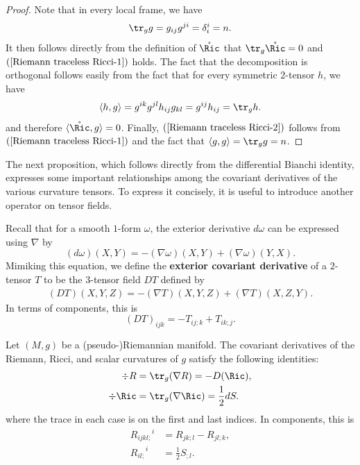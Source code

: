 \begin{proof}
Note that in every local frame, we have
\[\tr_gg=g_{ij}g^{ji}=\delta_i^i=n.\]
It then follows directly from the definition of $\mathring{\Ric}$ that $\tr_g\mathring{\Ric}=0$ and $(\ref{Riemann traceless Ricci-1})$ holds. The fact that the 
decomposition is orthogonal follows easily from the fact that for every symmetric $2$-tensor $h$, we have
\[\langle h,g\rangle=g^{ik}g^{jl}h_{ij}g_{kl}=g^{ij}h_{ij}=\tr_gh.\]
and therefore $\langle\mathring{\Ric},g\rangle=0$. Finally, $(\ref{Riemann traceless Ricci-2})$ follows from $(\ref{Riemann traceless Ricci-1})$ and the fact that 
$\langle g,g\rangle=\tr_gg=n$.
\end{proof}
The next proposition, which follows directly from the differential Bianchi identity, expresses some important relationships among the covariant derivatives of the 
various curvature tensors. To express it concisely, it is useful to introduce another operator on tensor fields.\par
Recall that for a smooth $1$-form $\omega$, the exterior derivative $d\omega$ can be expressed using $\nabla$ by
\[(d\omega)(X,Y)=-(\nabla\omega)(X,Y)+(\nabla\omega)(Y,X).\]
Mimiking this equation, we define the \textbf{exterior covariant derivative} of a $2$-tensor $T$ to be the $3$-tensor field $DT$ defined by
\begin{align}\label{Riemann ext derivative 2-tensor}
(DT)(X,Y,Z)=-(\nabla T)(X,Y,Z)+(\nabla T)(X,Z,Y).
\end{align}
In terms of components, this is
\[(DT)_{ijk}=-T_{ij;k}+T_{ik;j}.\]
\begin{proposition}
Let $(M,g)$ be a (pseudo-)Riemannian manifold. The covariant derivatives of the Riemann, Ricci, and scalar curvatures of $g$ satisfy the following 
identities:
\begin{align}
\div R&=\tr_g(\nabla R)=-D(\Ric),\label{Riemann contracted Bianchi-1}\\
\div \Ric&=\tr_g(\nabla\Ric)=\frac{1}{2}dS.\label{Riemann contracted Bianchi-2}
\end{align}
where the trace in each case is on the first and last indices. In components, this is
\begin{align}
{R_{ijkl;}}^i&=R_{jk;l}-R_{jl;k},\label{Riemann contracted Bianchi-3}\\
{R_{il;}}^{i}&=\frac{1}{2}S_{;l}.\label{Riemann contracted Bianchi-4}
\end{align}
\end{proposition}
